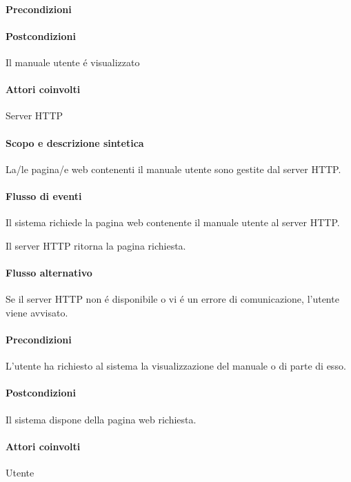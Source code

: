 \paragraph{Precondizioni}
\paragraph{Postcondizioni} Il manuale utente \'e visualizzato

\paragraph{Attori coinvolti} Server HTTP
\paragraph{Scopo e descrizione sintetica}
La/le pagina/e web contenenti il manuale utente sono gestite dal server HTTP.
\paragraph{Flusso di eventi}
\begin{elenconumerato}[\textbf{}]{\subsubsecindent}
\item Il sistema richiede la pagina web contenente il manuale utente al server HTTP.
\item Il server HTTP ritorna la pagina richiesta.
\end{elenconumerato}
\paragraph{Flusso alternativo}
Se il server HTTP non \'e disponibile o vi \'e un errore di comunicazione, l'utente viene avvisato.
\paragraph{Precondizioni} L'utente ha richiesto al sistema la visualizzazione del manuale o di parte di esso.
\paragraph{Postcondizioni} Il sistema dispone della pagina web richiesta.

\paragraph{Attori coinvolti} Utente

